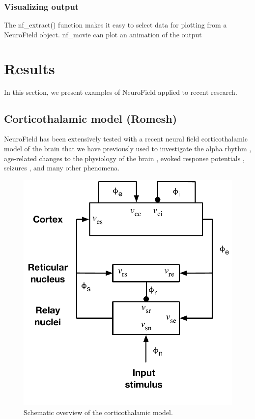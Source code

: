 \documentclass[preprint,review,10pt,authoryear,letterpaper]{elsarticle}
\begin{document}
\subsubsection{Visualizing output}
The nf\_extract() function makes it easy to select data for plotting from a NeuroField object.  
nf\_movie can plot an animation of the output

\clearpage

\section{Results}

In this section, we present examples of NeuroField applied to recent research.

\subsection{Corticothalamic model (Romesh)}

NeuroField has been extensively tested with a recent neural field corticothalamic model of the brain \citep{Robinson2005,Rowe2004413,PhysRevE.63.021903,PhysRevE.65.041924,Robinson:04aa} that we have previously used to investigate the alpha rhythm \citep{PhysRevE.68.021922,PhysRevE.70.011911}, age-related changes to the physiology of the brain \citep{VanAlbada2010}, evoked response potentials \citep{Rennie2002,ker11}, seizures \citep{Breakspear2006}, and many other phenomena. 

\begin{figure}[!b]
\begin{center}
\includegraphics[width=0.40\columnwidth]{EIRS_clean}
\caption{Schematic overview of the corticothalamic model.}
\label{fig:ct_schematic}
\end{center}
\end{figure}
\end{document}
